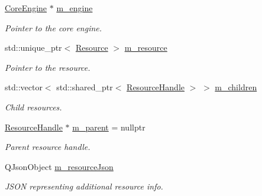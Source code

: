 \begin{DoxyCompactItemize}
\mbox{\hyperlink{classrev_1_1_core_engine}{Core\+Engine}} $\ast$ \mbox{\hyperlink{classrev_1_1_resource_handle_a41b015e217fa62fc4607a878f2e0fba6}{m\+\_\+engine}}
\begin{DoxyCompactList}\small\item\em Pointer to the core engine. \end{DoxyCompactList}\item 
\mbox{\label{classrev_1_1_resource_handle_a567145ce8affcf7f10e82f28220e7e5a}} 
std\+::unique\+\_\+ptr$<$ \mbox{\hyperlink{classrev_1_1_resource}{Resource}} $>$ \mbox{\hyperlink{classrev_1_1_resource_handle_a567145ce8affcf7f10e82f28220e7e5a}{m\+\_\+resource}}
\begin{DoxyCompactList}\small\item\em Pointer to the resource. \end{DoxyCompactList}\item 
\mbox{\label{classrev_1_1_resource_handle_ac202b51e88eb0c4aedcd0e5a754773ab}} 
std\+::vector$<$ std\+::shared\+\_\+ptr$<$ \mbox{\hyperlink{classrev_1_1_resource_handle}{Resource\+Handle}} $>$ $>$ \mbox{\hyperlink{classrev_1_1_resource_handle_ac202b51e88eb0c4aedcd0e5a754773ab}{m\+\_\+children}}
\begin{DoxyCompactList}\small\item\em Child resources. \end{DoxyCompactList}\item 
\mbox{\label{classrev_1_1_resource_handle_a99a043b4931ff23c2ecc4049a6a13d0f}} 
\mbox{\hyperlink{classrev_1_1_resource_handle}{Resource\+Handle}} $\ast$ \mbox{\hyperlink{classrev_1_1_resource_handle_a99a043b4931ff23c2ecc4049a6a13d0f}{m\+\_\+parent}} = nullptr
\begin{DoxyCompactList}\small\item\em Parent resource handle. \end{DoxyCompactList}\item 
\mbox{\label{classrev_1_1_resource_handle_a1f7c2b7bd065af84f556f5d7ee4ce03b}} 
Q\+Json\+Object \mbox{\hyperlink{classrev_1_1_resource_handle_a1f7c2b7bd065af84f556f5d7ee4ce03b}{m\+\_\+resource\+Json}}
\begin{DoxyCompactList}\small\item\em J\+S\+ON representing additional resource info. \end{DoxyCompactList}\item 

\end{DoxyCompactItemize}
